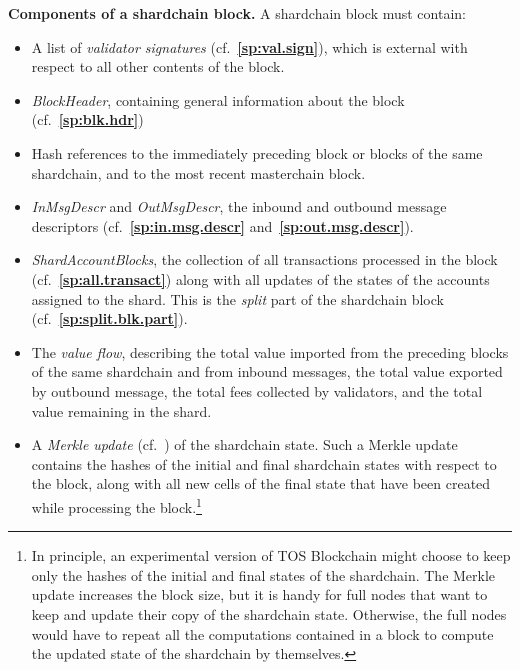 \documentclass[12pt,oneside]{article}
\def\makepoint#1{\medbreak\noindent{\bf #1.\ }}
\def\nxsubpoint{\refstepcounter{subsubsection}%
  \smallbreak\makepoint{\thesubsubsection}}
\def\refpoint#1{{\rm\textbf{\ref{#1}}}}
\let\ptref=\refpoint
\def\emb#1{\textbf{#1.}}
\begin{document}
\nxsubpoint\label{sp:shard.blk.comp}\emb{Components of a shardchain block}
A shardchain block must contain:
\begin{itemize}
\item A list of {\em validator signatures\/} (cf.~\ptref{sp:val.sign}), which is external with respect to all other contents of the block.
\item {\em BlockHeader}, containing general information about the block (cf.~\ptref{sp:blk.hdr})
\item Hash references to the immediately preceding block or blocks of the same shardchain, and to the most recent masterchain block.
\item {\em InMsgDescr\/} and {\em OutMsgDescr}, the inbound and outbound message descriptors (cf.~\ptref{sp:in.msg.descr} and~\ptref{sp:out.msg.descr}).
\item {\em ShardAccountBlocks}, the collection of all transactions processed in the block (cf.~\ptref{sp:all.transact}) along with all updates of the states of the accounts assigned to the shard. This is the {\em split\/} part of the shardchain block (cf.~\ptref{sp:split.blk.part}).
\item The {\em value flow}, describing the total value imported from the preceding blocks of the same shardchain and from inbound messages, the total value exported by outbound message, the total fees collected by validators, and the total value remaining in the shard.
\item A {\em Merkle update\/} (cf.~\cite[3.1]{TVM}) of the shardchain state. Such a Merkle update contains the hashes of the initial and final shardchain states with respect to the block, along with all new cells of the final state that have been created while processing the block.\footnote{In principle, an experimental version of TOS Blockchain might choose to keep only the hashes of the initial and final states of the shardchain. The Merkle update increases the block size, but it is handy for full nodes that want to keep and update their copy of the shardchain state. Otherwise, the full nodes would have to repeat all the computations contained in a block to compute the updated state of the shardchain by themselves.}
\end{itemize}
\end{document}
